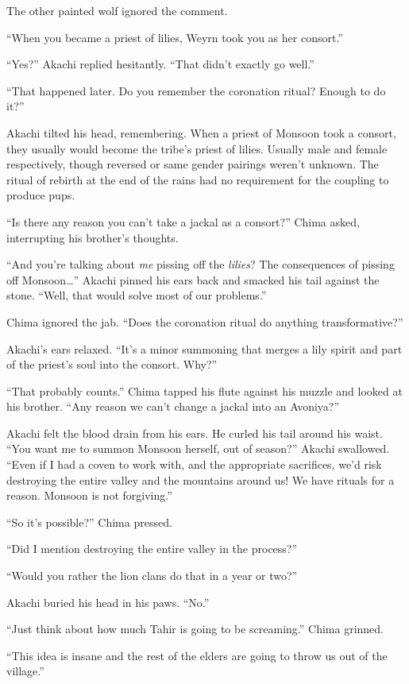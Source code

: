 The other painted wolf ignored the comment.

``When you became a priest of lilies, Weyrn took you as her consort.''

``Yes?'' Akachi replied hesitantly. ``That didn't exactly go well.''

``That happened later. Do you remember the coronation ritual? Enough to do it?''

Akachi tilted his head, remembering. When a priest of Monsoon took a consort, they usually would become the tribe's priest of lilies. Usually male and female respectively, though reversed or same gender pairings weren't unknown. The ritual of rebirth at the end of the rains had no requirement for the coupling to produce pups.

``Is there any reason you can't take a jackal as a consort?'' Chima asked, interrupting his brother's thoughts.

``And you're talking about \emph{me} pissing off the \emph{lilies}? The consequences of pissing off Monsoon\ldots'' Akachi pinned his ears back and smacked his tail against the stone. ``Well, that would solve most of our problems.''

Chima ignored the jab. ``Does the coronation ritual do anything transformative?''

Akachi's ears relaxed. ``It's a minor summoning that merges a lily spirit and part of the priest's soul into the consort. Why?''

``That probably counts.'' Chima tapped his flute against his muzzle and looked at his brother. ``Any reason we can't change a jackal into an Avoniya?''

Akachi felt the blood drain from his ears. He curled his tail around his waist. ``You want me to summon Monsoon herself, out of season?'' Akachi swallowed. ``Even if I had a coven to work with, and the appropriate sacrifices, we'd risk destroying the entire valley and the mountains around us! We have rituals for a reason. Monsoon is not forgiving.''

``So it's possible?'' Chima pressed.

``Did I mention destroying the entire valley in the process?''

``Would you rather the lion clans do that in a year or two?''

Akachi buried his head in his paws. ``No.''

``Just think about how much Tahir is going to be screaming.'' Chima grinned.

``This idea is insane and the rest of the elders are going to throw us out of the village.''

